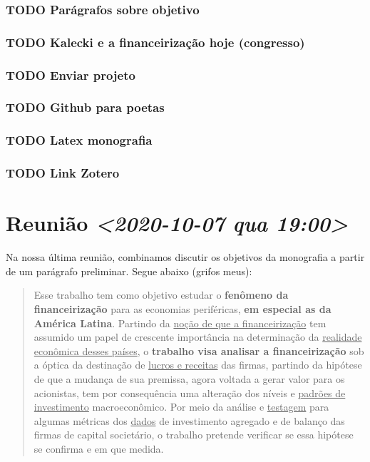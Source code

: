 \documentclass[11pt]{article}
\begin{document}
\subsubsection*{{\bfseries\sffamily TODO} Parágrafos sobre objetivo}
\label{sec:org03d42be}
\subsubsection*{{\bfseries\sffamily TODO} Kalecki e a financeirização hoje (congresso)}
\label{sec:orgc8106fc}
\subsubsection*{{\bfseries\sffamily TODO} Enviar projeto}
\label{sec:org4207253}
\subsubsection*{{\bfseries\sffamily TODO} Github para poetas}
\label{sec:org52c391d}
\subsubsection*{{\bfseries\sffamily TODO} Latex monografia}
\label{sec:org79126ec}
\subsubsection*{{\bfseries\sffamily TODO} Link Zotero}
\label{sec:org48fb42f}

\section*{Reunião \textit{<2020-10-07 qua 19:00>}}
\label{sec:org7ff123f}

Na nossa última reunião, combinamos discutir os objetivos da monografia a partir de um parágrafo preliminar. Segue abaixo (grifos meus):

\begin{quote}
Esse trabalho tem como objetivo estudar o \textbf{fenômeno da financeirização} para as economias periféricas, \textbf{em especial as da América Latina}. Partindo da \uline{noção de que a financeirização}  tem assumido um papel de crescente importância na determinação da \uline{realidade econômica desses países}, o \textbf{trabalho visa analisar a financeirização} sob a óptica da destinação de \uline{lucros e receitas} das firmas, partindo da hipótese de que a mudança de sua premissa, agora voltada a gerar valor para os acionistas, tem por consequência uma alteração dos níveis e \uline{padrões de investimento} macroeconômico. Por meio da análise e \uline{testagem} para algumas métricas dos \uline{dados} de investimento agregado e de balanço das firmas de capital societário, o trabalho pretende verificar se essa hipótese se confirma e em que medida.
\end{quote}
\end{document}
